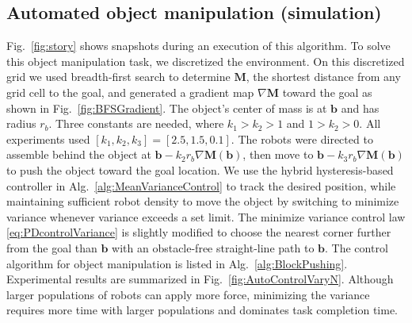 \subsection{Automated object manipulation (simulation)}
Fig.~\ref{fig:story} shows snapshots during an execution of this algorithm. To solve this object manipulation task, we discretized the environment. On this discretized grid we used breadth-first search to determine $\mathbf{M}$, the shortest distance from any grid cell to the goal, and generated a gradient map $\nabla \mathbf{M}$ toward the goal as shown in Fig.~\ref{fig:BFSGradient}.  The object's center of mass is at $\mathbf{b}$ and has radius $r_b$. 
Three constants are needed, where $k_1>k_2>1$ and $1>k_2>0$. All experiments used $[k_1,k_2,k_3] = [2.5,1.5,0.1]$.
The robots were directed to assemble behind the object at  $\mathbf{b} - k_2 r_b \nabla \mathbf{M}(\mathbf{b})$, then move to  $\mathbf{b} - k_3 r_b \nabla \mathbf{M}(\mathbf{b})$ to push the object toward the goal location. We use the hybrid hysteresis-based controller in Alg.~\ref{alg:MeanVarianceControl}  to track the desired position, while maintaining sufficient robot density to move the object by switching to minimize variance whenever variance exceeds a set limit. The minimize variance control law \eqref{eq:PDcontrolVariance} is slightly modified to choose the nearest corner further from the goal than $\mathbf{b}$ with an obstacle-free straight-line path to $\mathbf{b}$. 
The control algorithm  for object manipulation is listed in Alg.~\ref{alg:BlockPushing}. 
Experimental results are summarized in Fig.~\ref{fig:AutoControlVaryN}.  Although larger populations of robots can apply more force, minimizing the variance requires more time with larger populations and dominates task completion time.

